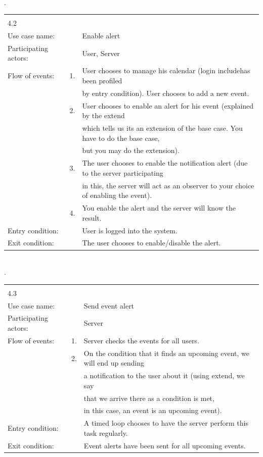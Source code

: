 \documentclass{article}
\begin{document}
	\\
	.\\
\begin{tabular}{l r @{} l}
	\multicolumn{2}{c}{} \\
	4.2&&\\
	\hline
	Use case name:	&&Enable alert\\
	\hline
	Participating actors:&&User, Server \\
	\hline
	Flow of events:	&1.&User chooses to manage his calendar (login \flqq include\frqq has been profiled\\
				&&by entry condition). User chooses to add a new event.\\
				&2.&User chooses to enable an alert for his event (explained by the \flqq extend\frqq\\
					&& which tells us its an extension of the base case. You have to do the base case,\\
					&& but you may do the extension).\\
				&3.&The user chooses to enable the notification alert (due to the server participating\\
					&& in this, the server will act as an observer to your choice of enabling the event).\\
				&4.&You enable the alert and the server will know the result.\\
	\hline
	Entry condition:	&&User is logged into the system.\\
	\hline
	Exit condition:	&&The user chooses to enable/disable the alert.\\
	\hline
\end{tabular}
	\\
	.\\
\begin{tabular}{l r @{} l}
	\multicolumn{2}{c}{} \\
	4.3&&\\
	\hline
	Use case name:	&&Send event alert\\
	\hline
	Participating actors:&&Server\\
	\hline
	Flow of events:	&1.&Server checks the events for all users.\\
				&2.&On the condition that it finds an upcoming event, we will end up sending\\
					&&a notification to the user about it (using \flqq extend\frqq, we say\\
					&&that we arrive there as a condition is met,\\
					&&in this case, an event is an upcoming event).\\
	\hline
	Entry condition:	&&A timed loop chooses to have the server perform this task regularly.\\
	\hline
	Exit condition:	&&Event alerts have been sent for all upcoming events.\\
	\hline
\end{tabular}
\end{document}

